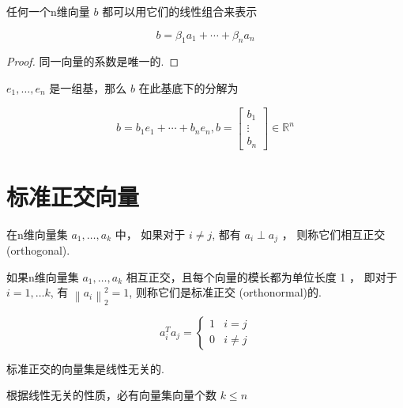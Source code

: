 \begin{definition}
    任何一个n维向量 $ b $ 都可以用它们的线性组合来表示

$$
b=\beta_{1} a_{1}+\cdots+\beta_{n} a_{n}
$$
\end{definition}

\begin{proof}
    同一向量的系数是唯一的. 
\end{proof}

\begin{example}
    $ e_{1}, \ldots, e_{n} $ 是一组基，那么 $ b $ 在此基底下的分解为

    $$ b=b_{1} e_{1}+\cdots+b_{n} e_{n} ,b=\left[\begin{array}{c}b_{1} \\ \vdots \\ b_{n}\end{array}\right] \in \mathbb{R}^{n} $$
\end{example}

\section{标准正交向量}

\begin{definition}
    在n维向量集 $ a_{1}, \ldots, a_{k} $ 中， 如果对于 $ i \neq j $, 都有 $ a_{i} \perp a_{j} $ ， 则称它们相互正交(orthogonal). 
\end{definition}

\begin{definition}
    如果n维向量集 $ a_{1}, \ldots, a_{k} $ 相互正交，且每个向量的模长都为单位长度 1 ， 即对于 $ i=1, \ldots k $, 有 $ \left\|a_{i}\right\|_{2}^{2}=1 $, 则称它们是标准正交 (orthonormal)的. 

    $$ a_{i}^{T} a_{j}=\left\{\begin{array}{ll}1 & i=j \\ 0 & i \neq j\end{array}\right. $$
\end{definition}

\begin{corollary}
    标准正交的向量集是线性无关的. 
\end{corollary}

\begin{corollary}
    根据线性无关的性质，必有向量集向量个数 $ k \leq n $
\end{corollary}

